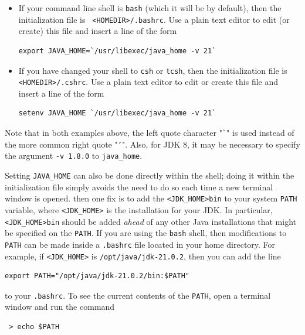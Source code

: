 \begin{itemize}

\item If your command line shell is {\tt bash} (which
it will be by default), then the initialization file is {\tt
<HOMEDIR>/.bashrc}. Use a plain text editor to edit (or create) this file and
insert a line of the form
%
\begin{lstlisting}[]
  export JAVA_HOME=`/usr/libexec/java_home -v 21`
\end{lstlisting}
%

\item If you have changed your shell to {\tt csh} or {\tt tcsh},
then the initialization file is {\tt <HOMEDIR>/.cshrc}. Use a plain text editor
to edit or create this file and insert a line of the form
%
\begin{lstlisting}[]
  setenv JAVA_HOME `/usr/libexec/java_home -v 21`
\end{lstlisting}
%

\end{itemize}

Note that in both examples above, the left quote character "{\tt \`{}}" is used
instead of the more common right quote "{\tt '}".  Also, for JDK 8, it may be
necessary to specify the argument {\tt -v 1.8.0} to {\tt java\_home}.

Setting {\tt JAVA\_HOME} can also be done directly within the shell;
doing it within the initialization file simply avoids the need to do
so each time a new terminal window is opened.
\fi
\ifLinux
then one fix is to add the \directory{} {\tt <JDK\_HOME>\SEP bin} to
your system {\tt PATH} variable, where {\tt <JDK\_HOME>} is the
installation \directory{} for your JDK.  In particular, {\tt
<JDK\_HOME>\SEP bin} should be added {\it ahead} of any other Java
installations that might be specified on the {\tt PATH}.  If you are
using the {\tt bash} shell, then modifications to {\tt PATH} can be
made inside a {\tt .bashrc} file located in your home directory.
For example, if {\tt <JDK\_HOME>} is {\tt /opt/java/jdk-21.0.2},
then you can add the line
\begin{verbatim}
export PATH="/opt/java/jdk-21.0.2/bin:$PATH"
\end{verbatim}
to your {\tt .bashrc}. To see the current contents of the {\tt PATH},
open a terminal window and run the command
\begin{verbatim}
 > echo $PATH
\end{verbatim}
\fi


